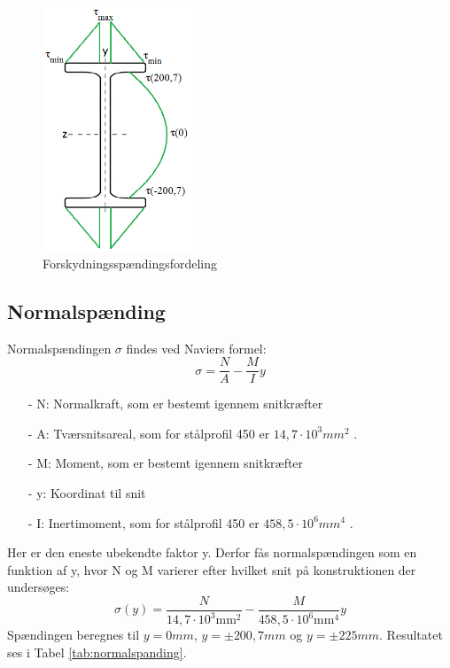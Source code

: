 \begin{figure}[H]
	\centering
	\includegraphics[width=0.4\textwidth]{billeder/forskydningsfordeling.png}
	\caption{Forskydningsspændingsfordeling}
	\label{fig:forskydfordeling}
\end{figure}

\subsection{Normalspænding}
Normalspændingen $\sigma$ findes ved Naviers formel:
\begin{equation}
\sigma = \frac{N}{A} - \frac{M}{I} y
\end{equation}

\begin{itemize}
	\item[-] N: Normalkraft, som er bestemt igennem snitkræfter
	\item[-] A: Tværsnitsareal, som for stålprofil 450 er $14,\!7 \cdot 10^3 mm^2$ \citep{stabi}. 
	\item[-] M: Moment, som er bestemt igennem snitkræfter
	\item[-] y: Koordinat til snit
	\item[-] I: Inertimoment, som for stålprofil 450 er $458,\!5 \cdot 10^6 mm^4$ \citep{stabi}. 
\end{itemize} 

Her er den eneste ubekendte faktor y. Derfor fås normalspændingen som en funktion af y, hvor N og M varierer efter hvilket snit på konstruktionen der undersøges:
\begin{equation}
	\sigma(y) = \frac{N}{14,\!7 \cdot 10^3 \text{mm}^2} - \frac{M}{458,\!5 \cdot 10^6 \text{mm}^4} y
\end{equation}
Spændingen beregnes til $y = 0 mm$, $y = \pm 200,\!7 mm$ og $y = \pm 225 mm$. Resultatet ses i Tabel \ref{tab:normalspanding}.

